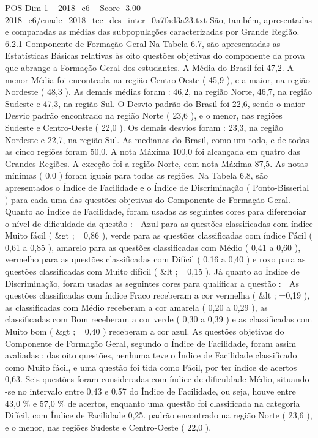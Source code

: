 \begin{textsample}{POS Dim 1 – 2018\_c6 – Score -3.00 – 2018\_c6/enade\_2018\_tec\_des\_inter\_0a7fad3a23.txt}
São, também, apresentadas e comparadas as médias das subpopulações caracterizadas por Grande Região. 6.2.1 Componente de Formação Geral Na Tabela 6.7, são apresentadas as Estatísticas Básicas relativas às oito questões objetivas do componente da prova que abrange a Formação Geral dos estudantes.
A Média do Brasil foi 47,2.
A menor Média foi encontrada na região Centro-Oeste ( 45,9 ), e a maior, na região Nordeste ( 48,3 ).
As demais médias foram : 46,2, na região Norte, 46,7, na região Sudeste e 47,3, na região Sul.
O Desvio padrão do Brasil foi 22,6, sendo o maior Desvio padrão encontrado na região Norte ( 23,6 ), e o menor, nas regiões Sudeste e Centro-Oeste ( 22,0 ).
Os demais desvios foram : 23,3, na região Nordeste e 22,7, na região Sul.
As medianas do Brasil, como um todo, e de todas as cinco regiões foram 50,0.
A nota Máxima 100,0 foi alcançada em quatro das Grandes Regiões.
A exceção foi a região Norte, com nota Máxima 87,5.
As notas mínimas ( 0,0 ) foram iguais para todas as regiões.
Na Tabela 6.8, são apresentados o Índice de Facilidade e o Índice de Discriminação ( Ponto-Bisserial ) para cada uma das questões objetivas do Componente de Formação Geral.
Quanto ao Índice de Facilidade, foram usadas as seguintes cores para diferenciar o nível de dificuldade da questão :  Azul para as questões classificadas com índice Muito fácil ( \&gt ; =0,86 ), verde para as questões classificadas com índice Fácil ( 0,61 a 0,85 ), amarelo para as questões classificadas com Médio ( 0,41 a 0,60 ), vermelho para as questões classificadas com Difícil ( 0,16 a 0,40 ) e roxo para as questões classificadas com Muito difícil ( \&lt ; =0,15 ).
Já quanto ao Índice de Discriminação, foram usadas as seguintes cores para qualificar a questão :  As questões classificadas com índice Fraco receberam a cor vermelha ( \&lt ; =0,19 ), as classificadas com Médio receberam a cor amarela ( 0,20 a 0,29 ), as classificadas com Bom receberam a cor verde ( 0,30 a 0,39 ) e as classificadas com Muito bom ( \&gt ; =0,40 ) receberam a cor azul.
As questões objetivas do Componente de Formação Geral, segundo o Índice de Facilidade, foram assim avaliadas : das oito questões, nenhuma teve o Índice de Facilidade classificado como Muito fácil, e uma questão foi tida como Fácil, por ter índice de acertos 0,63.
Seis questões foram consideradas com índice de dificuldade Médio, situando -se no intervalo entre 0,43 e 0,57 do Índice de Facilidade, ou seja, houve entre 43,0 \% e 57,0 \% de acertos, enquanto uma questão foi classificada na categoria Difícil, com Índice de Facilidade 0,25. padrão encontrado na região Norte ( 23,6 ), e o menor, nas regiões Sudeste e Centro-Oeste ( 22,0 ).

\end{textsample}
